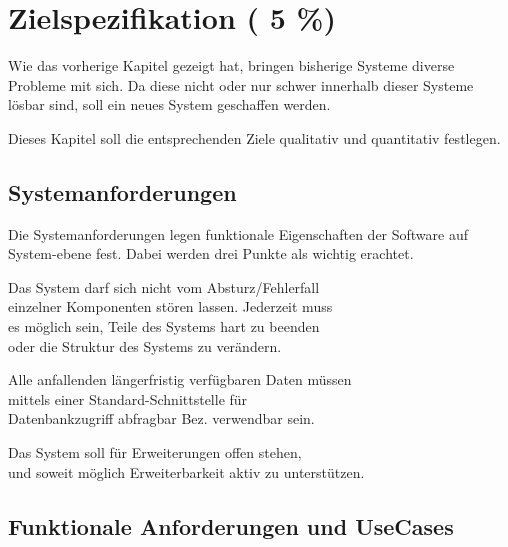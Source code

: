 \chapter{Zielspezifikation ( 5 \%)}
\label{chap:target}
Wie das vorherige Kapitel gezeigt hat,
bringen bisherige Systeme diverse Probleme mit sich.
Da diese nicht oder nur schwer innerhalb dieser Systeme lösbar sind,
soll ein neues System geschaffen werden.

Dieses Kapitel soll die entsprechenden Ziele
qualitativ und quantitativ festlegen.






\section{Systemanforderungen}

Die Systemanforderungen legen funktionale Eigenschaften der Software auf System-ebene fest.
Dabei werden drei Punkte als wichtig erachtet.


\begin{description}

\dhitem[S1]
  Das System darf sich nicht vom Absturz/Fehlerfall \\
  einzelner Komponenten stören lassen. Jederzeit muss \\
  es möglich sein, Teile des Systems hart zu beenden \\
  oder die Struktur des Systems zu verändern.

\dhitem[S2]
  Alle anfallenden längerfristig verfügbaren Daten müssen\\
  mittels einer Standard-Schnittstelle für \\
  Datenbankzugriff abfragbar Bez. verwendbar sein.

\dhitem[S3]
  Das System soll für Erweiterungen offen stehen, \\
  und soweit möglich Erweiterbarkeit aktiv zu unterstützen.
\end{description}


\section{Funktionale Anforderungen und UseCases}

